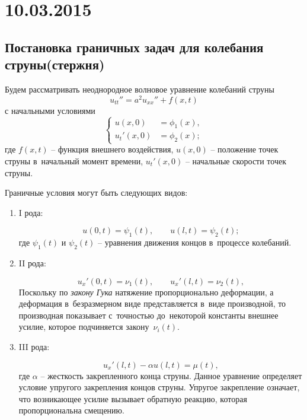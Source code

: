 \section{10.03.2015}
\subsection{Постановка граничных задач для колебания струны(стержня)}

Будем рассматривать неоднородное волновое уравнение колебаний струны
\begin{equation}\label{eq:inhom_wave}
	u_{tt}'' = a^2 u_{xx}'' + f(x,t)
\end{equation}
с начальными условиями
\begin{equation}\label{eq:inhom_wave_init_cond}
	\left\{
        \begin{aligned}
			u(x,0) &= \phi_1(x), \\
			u_t'(x,0) &= \phi_2(x);
		\end{aligned}
    \right.
\end{equation}
где $f(x,t)$ -- функция внешнего воздействия, $u(x,0)$ -- положение точек струны в~начальный момент времени, 
$u_t'(x,0)$ -- начальные скорости точек струны.

Граничные условия могут быть следующих видов:
\begin{enumerate}
	\item I рода:

	\begin{equation}\label{eq:inhom_wave_bound_cond1}
		u(0,t) = \psi_1(t), \qquad u(l,t) = \psi_2(t); 
	\end{equation}
	где $\psi_1(t)$ и $\psi_2(t)$ -- уравнения движения концов в~процессе колебаний.

	\item II рода:

	\begin{equation}\label{eq:inhom_wave_bound_cond2}
		u_x'(0,t) = \nu_1(t), \qquad u_x'(l,t) = \nu_2(t), 
	\end{equation}
	Поскольку по \emph{закону Гука} натяжение пропорционально деформации, а деформация в~безразмерном виде представляется в~виде производной, то производная показывает
	с~точностью до~некоторой константы внешнее усилие, которое подчиняется закону~$\nu_i(t)$.

	\item III рода:

	\begin{equation}\label{eq:inhom_wave_bound_cond3}
		u_x'(l,t) - \alpha u(l,t) = \mu(t),
	\end{equation}
	где $\alpha$ -- жесткость закрепленного конца струны. Данное уравнение определяет условие упругого закрепления концов струны. Упругое закрепление
	означает, что возникающее усилие вызывает обратную реакцию, которая пропорциональна смещению.
\end{enumerate}

